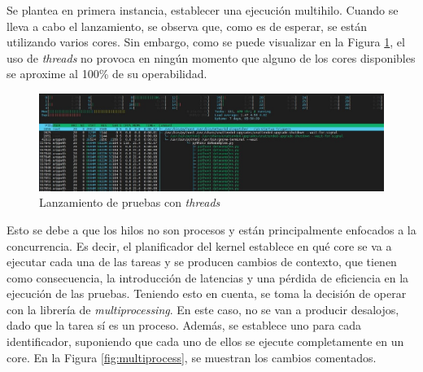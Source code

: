   
  


Se plantea en primera instancia, establecer una ejecución multihilo. Cuando se lleva a cabo el lanzamiento, se observa que, como es de esperar, se están utilizando varios cores. Sin embargo, como se puede visualizar en la Figura \ref{fig:multihilo}, el uso de \textit{threads} no provoca en ningún momento que alguno de los cores disponibles se aproxime al 100\% de su operabilidad.

\vspace{3mm}

\begin{figure}[h!]
  \centering
  \includegraphics[width=1\textwidth]{img/diseno/multihilo.jpg}
  \caption{Lanzamiento de pruebas con \textit{threads}}
  \label{fig:multihilo}
\end{figure}

\vspace{3mm}

Esto se debe a que los hilos no son procesos y están principalmente enfocados a la concurrencia. Es decir, el planificador del kernel establece en qué core se va a ejecutar cada una de las tareas y se producen cambios de contexto, que tienen como consecuencia, la introducción de latencias y una pérdida de eficiencia en la ejecución de las pruebas. Teniendo esto en cuenta, se toma la decisión de operar con la librería de \textit{multiprocessing}. En este caso, no se van a producir desalojos, dado que la tarea sí es un proceso. Además, se establece uno para cada identificador, suponiendo que cada uno de ellos se ejecute completamente en un core. En la Figura \ref{fig:multiprocess}, se muestran los cambios comentados. \cite{thread}

